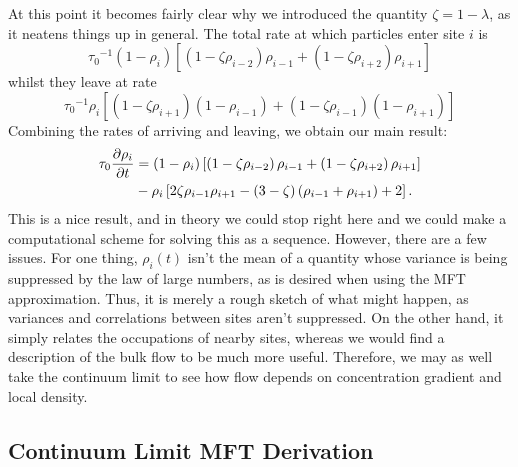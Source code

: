 At this point it becomes fairly clear why we introduced the quantity $\zeta = 1-\lambda$, as it neatens things up in general. The total rate at which particles enter site $i$ is
\begin{equation}
 {\tau_0}^{-1} \left(1-\rho_i \right) \left[ \left(1-\zeta \rho_{i-2} \right) \rho_{i-1} + \left(1-\zeta \rho_{i+2} \right) \rho_{i+1} \right]
\end{equation}
whilst they leave at rate
\begin{equation}
 {\tau_0}^{-1} \rho_i \left[ \left(1-\zeta \rho_{i+1} \right) \left(1 - \rho_{i-1} \right) + \left(1-\zeta \rho_{i-1} \right) \left(1 - \rho_{i+1} \right) \right]
\end{equation}
Combining the rates of arriving and leaving, we obtain our main result:
\begin{align}
\label{eq:latticeMFT}
\begin{split}
 \tau_0 \frac{\partial \rho_i}{\partial t} &= \left( 1-\rho_i \right) \left[ \left(1-\zeta\rho_{i-2} \right) \rho_{i-1} + \left(1-\zeta\rho_{i+2} \right) \rho_{i+1} \right] \\
 &- \rho_i \left[ 2 \zeta \rho_{i-1} \rho_{i+1}  - (3-\zeta)\left(\rho_{i-1} + \rho_{i+1}\right) + 2 \right].
 \end{split}
 \end{align}
This is a nice result, and in theory we could stop right here and we could make a computational scheme for solving this as a sequence. However, there are a few issues. For one thing, $\rho_i (t)$ isn't the mean of a quantity
whose variance is being suppressed by the law of large numbers, as is desired when using the MFT approximation.
Thus, it is merely a rough sketch of what might happen, as variances and correlations between sites aren't suppressed. On the other hand, it simply relates the occupations of nearby sites,
whereas we would find a description of the bulk flow to be much more useful. Therefore, we may as well take the continuum limit to see how flow depends on concentration gradient and local density.

\subsection{Continuum Limit MFT Derivation}

